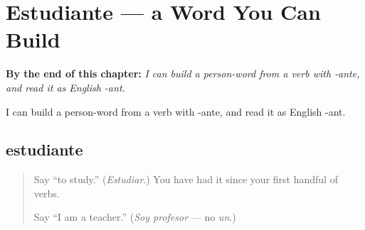 
\chapter{Estudiante --- a Word You Can Build}
\label{ch:estudiante}

\begin{chapteropening}
\textbf{By the end of this chapter:} \emph{I can build a person-word from a verb with -ante, and read it as English -ant.}

I can build a person-word from a verb with -ante, and read it as English -ant.
\end{chapteropening}

\section[estudiante]{estudiante}

\label{lesson:ES-C09-estudiante}



\begin{quote}
Say \textquotedblleft{}to study.\textquotedblright{} (\emph{Estudiar}.) You have had it since your first handful of verbs.

Say \textquotedblleft{}I am a teacher.\textquotedblright{} (\emph{Soy profesor} — no \emph{un}.)
\end{quote}


